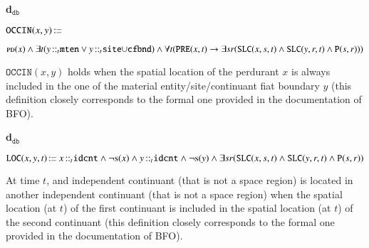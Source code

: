 \documentclass[ao]{iosart2x}
\newcommand{\nb}[1]{\textcolor{red}{$|$}\marginpar{\hspace*{-0cm}\parbox{20mm}{\scriptsize\raggedright\textcolor{red}{#1}}}}
\newcommand{\bfoDefLabel}{\textrm{d$_\texttt{b}$}}
\newcommand{\dbDefLabel}{\textrm{d$_\texttt{db}$}}
\newcounter{cntdbdf}
\newcommand{\dbdf}[1]{\refstepcounter{cntdbdf}\begin{small}{\bf \dbDefLabel\thecntdbdf\label{#1}}\end{small}}
\newcommand{\refbfodf}[1]{({\bfoDefLabel}\ref{#1})}
\newcommand{\pr}[1]{\mathtt{#1}}
\newcommand{\cn}[1]{\mathtt{#1}}
\newcommand\textequal{%
 \rule[.08ex]{5pt}{0.35pt}\llap{\rule[.78ex]{5pt}{0.35pt}}}
\newcommand{\sdef}{{\hspace{1.5pt}:\hspace{-2.5pt}\textequal\hspace{3pt}}}
\newcommand{\dolce}{{\textsc{dolce}}}
\newcommand {\PDdcat} {\textsc{pd}}
\newcommand {\Sdcat} {\textsc{s}}
\newcommand {\Pd} {\ensuremath{\pr{P}}}
\newcommand {\PREd} {\ensuremath{\pr{PRE}}}
\newcommand {\SLCd} {\ensuremath{\pr{SLC}}}
\newcommand{\idcntbcat}{\cn{idcnt}}
\newcommand{\mtenbcat}{\cn{mten}}
\newcommand{\sitebcat}{\cn{site}}
\newcommand{\cfbndbcat}{\cn{cfbnd}}
\newcommand{\bfoiof}[1]{{\,::_{#1\:\!}}}
\newcommand{\bfooccurs}{\pr{OCCIN}}
\newcommand{\bfolocated}{\pr{LOC}}
\begin{document}
\item[\dbdf{d2b_occurs}] $\bfooccurs(x,y) \sdef $\parbox[t]{\textwidth}{$\PDdcat(x) \land \exists t(y \bfoiof{t} \mtenbcat \lor y \bfoiof{t} \sitebcat{\cup}\cfbndbcat) \land \\ 
\forall t(\PREd(x,t) \to \exists sr(\SLCd(x,s,t) \land \SLCd(y,r,t) \land \Pd(s,r)))$}

\vspace{1pt}
$\bfooccurs(x,y)$ holds when the spatial location of the perdurant $x$ is always included in the one of the material entity/site/continuant fiat boundary $y$ (this definition closely corresponds to the formal one provided in the documentation of BFO).


\item[\dbdf{d2b_located}] $\bfolocated(x,y,t) \sdef x \bfoiof{t} \idcntbcat \land \neg\Sdcat(x) \land y \bfoiof{t} \idcntbcat \land \neg\Sdcat(y) \land
\exists sr(\SLCd(x,s,t) \land \SLCd(y,r,t) \land \Pd(s,r))$

\vspace{1pt}
At time $t$, and independent continuant (that is not a space region) is located in another independent continuant (that is not a space region) when the spatial location (at $t$) of the first continuant is included in the spatial location (at $t$) of the second continuant (this definition closely corresponds to the formal one provided in the documentation of BFO).%

%
\end{document}
